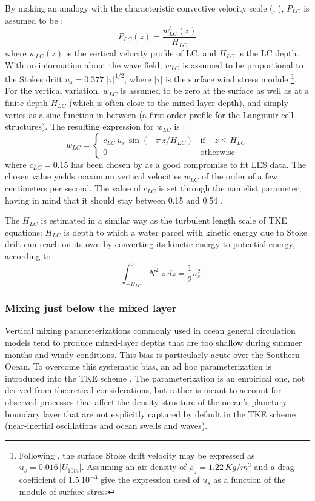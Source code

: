 \documentclass[../main/NEMO_manual]{subfiles}
\begin{document}
By making an analogy with the characteristic convective velocity scale (\eg, \citet{D'Alessio_al_JPO98}),
$P_{LC}$ is assumed to be : 
\[
P_{LC}(z) = \frac{w_{LC}^3(z)}{H_{LC}}
\]
where $w_{LC}(z)$ is the vertical velocity profile of LC, and $H_{LC}$ is the LC depth.
With no information about the wave field, $w_{LC}$ is assumed to be proportional to 
the Stokes drift $u_s = 0.377\,\,|\tau|^{1/2}$, where $|\tau|$ is the surface wind stress module 
\footnote{Following \citet{Li_Garrett_JMR93}, the surface Stoke drift velocity may be expressed as
  $u_s =  0.016 \,|U_{10m}|$.
  Assuming an air density of $\rho_a=1.22 \,Kg/m^3$ and a drag coefficient of
  $1.5~10^{-3}$ give the expression used of $u_s$ as a function of the module of surface stress
}.
For the vertical variation, $w_{LC}$ is assumed to be zero at the surface as well as at
a finite depth $H_{LC}$ (which is often close to the mixed layer depth),
and simply varies as a sine function in between (a first-order profile for the Langmuir cell structures). 
The resulting expression for $w_{LC}$ is :
\[
  w_{LC}  =
  \begin{cases}
    c_{LC} \,u_s \,\sin(- \pi\,z / H_{LC} )    &      \text{if $-z \leq H_{LC}$} 	\\
    0                 				 &      \text{otherwise}
  \end{cases}
\]
where $c_{LC} = 0.15$ has been chosen by \citep{Axell_JGR02} as a good compromise to fit LES data.
The chosen value yields maximum vertical velocities $w_{LC}$ of the order of a few centimeters per second.
The value of $c_{LC}$ is set through the  namelist parameter,
having in mind that it should stay between 0.15 and 0.54 \citep{Axell_JGR02}. 

The $H_{LC}$ is estimated in a similar way as the turbulent length scale of TKE equations:
$H_{LC}$ is depth to which a water parcel with kinetic energy due to Stoke drift can reach on its own by
converting its kinetic energy to potential energy, according to 
\[
- \int_{-H_{LC}}^0 { N^2\;z  \;dz} = \frac{1}{2} u_s^2
\]

\subsubsection{Mixing just below the mixed layer}

Vertical mixing parameterizations commonly used in ocean general circulation models tend to
produce mixed-layer depths that are too shallow during summer months and windy conditions.
This bias is particularly acute over the Southern Ocean.
To overcome this systematic bias, an ad hoc parameterization is introduced into the TKE scheme \cite{Rodgers_2014}. 
The parameterization is an empirical one, \ie not derived from theoretical considerations,
but rather is meant to account for observed processes that affect the density structure of 
the ocean’s planetary boundary layer that are not explicitly captured by default in the TKE scheme 
(\ie near-inertial oscillations and ocean swells and waves).
\end{document}
